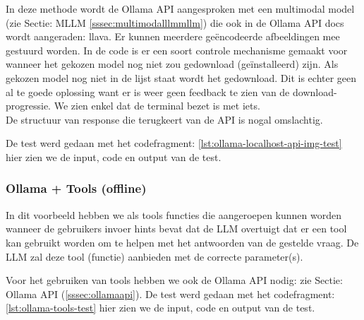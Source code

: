 In deze methode wordt de Ollama API aangesproken met een multimodal model (zie Sectie: MLLM \ref{sssec:multimodalllmmllm}) die ook in de Ollama API docs wordt aangeraden: llava. Er kunnen meerdere geëncodeerde afbeeldingen mee gestuurd worden. In de code is er een soort controle mechanisme gemaakt voor wanneer het gekozen model nog niet zou gedownload (geïnstalleerd) zijn. Als gekozen model nog niet in de lijst staat wordt het gedownload. Dit is echter geen al te goede oplossing want er is weer geen feedback te zien van de download-progressie. We zien enkel dat de terminal bezet is met iets. \\

De structuur van response die terugkeert van de API is nogal omslachtig.

De test werd gedaan met het codefragment: \ref{lst:ollama-localhost-api-img-test} hier zien we de input, code en output van de test.

\subsubsection{Ollama + Tools (offline)}
\label{sssec:ollamaplustools}

In dit voorbeeld hebben we als tools functies die aangeroepen kunnen worden wanneer de gebruikers invoer hints bevat dat de LLM overtuigt dat er een tool kan gebruikt worden om te helpen met het antwoorden van de gestelde vraag. De LLM zal deze tool (functie) aanbieden met de correcte parameter(s).

Voor het gebruiken van tools hebben we ook de Ollama API nodig: zie Sectie: Ollama API (\ref{sssec:ollamaapi}).
De test werd gedaan met het codefragment: \ref{lst:ollama-tools-test} hier zien we de input, code en output van de test.

